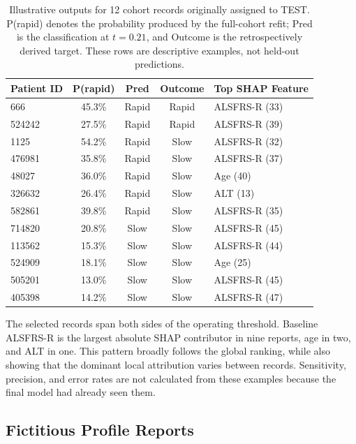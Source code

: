 \begin{table}[ht!]
\centering
\caption[Reports for 12 cohort records]{Illustrative outputs for 12 cohort records originally assigned to TEST. P(rapid) denotes the probability produced by the full-cohort refit; Pred is the classification at $t=0.21$, and Outcome is the retrospectively derived target. These rows are descriptive examples, not held-out predictions.}
\label{tab:real_patient_reports}
\small
\begin{tabular}{lcccl}
\toprule
Patient ID & P(rapid) & Pred & Outcome & Top SHAP Feature \\
\midrule
666     & 45.3\% & Rapid & Rapid & ALSFRS-R (33) \\
524242  & 27.5\% & Rapid & Rapid & ALSFRS-R (39) \\
1125    & 54.2\% & Rapid & Slow  & ALSFRS-R (32) \\
476981  & 35.8\% & Rapid & Slow  & ALSFRS-R (37) \\
48027   & 36.0\% & Rapid & Slow  & Age (40) \\
326632  & 26.4\% & Rapid & Slow  & ALT (13) \\
582861  & 39.8\% & Rapid & Slow  & ALSFRS-R (35) \\
714820  & 20.8\% & Slow  & Slow  & ALSFRS-R (45) \\
113562  & 15.3\% & Slow  & Slow  & ALSFRS-R (44) \\
524909  & 18.1\% & Slow  & Slow  & Age (25) \\
505201  & 13.0\% & Slow  & Slow  & ALSFRS-R (45) \\
405398  & 14.2\% & Slow  & Slow  & ALSFRS-R (47) \\
\bottomrule
\end{tabular}
\end{table}

The selected records span both sides of the operating threshold. Baseline \gls{ALSFRS-R} is the largest absolute \gls{SHAP} contributor in nine reports, age in two, and ALT in one. This pattern broadly follows the global ranking, while also showing that the dominant local attribution varies between records. Sensitivity, precision, and error rates are not calculated from these examples because the final model had already seen them.

\subsection{Fictitious Profile Reports}
\label{subsec:results_synthetic_reports}

